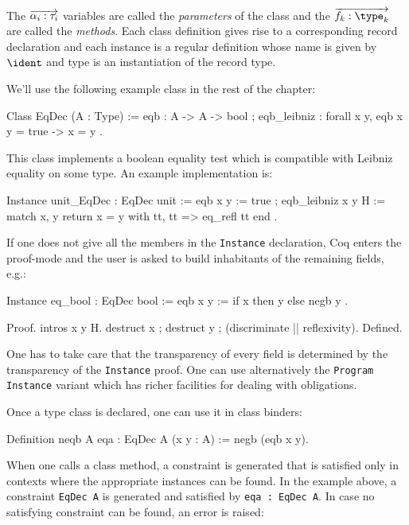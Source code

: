 The $\overrightarrow{\alpha_i : \tau_i}$ variables are called the \emph{parameters}
of the class and the $\tele{f_k : \type_k}$ are called the
\emph{methods}. Each class definition gives rise to a corresponding
record declaration and each instance is a regular definition whose name
is given by $\ident$ and type is an instantiation of the record type.

We'll use the following example class in the rest of the chapter:

\begin{coq_example*}
Class EqDec (A : Type) := {
  eqb : A -> A -> bool ;
  eqb_leibniz : forall x y, eqb x y = true -> x = y }.
\end{coq_example*}

This class implements a boolean equality test which is compatible with
Leibniz equality on some type. An example implementation is:

\begin{coq_example*}
Instance unit_EqDec : EqDec unit :=
{ eqb x y := true ;
  eqb_leibniz x y H := 
    match x, y return x = y with tt, tt => eq_refl tt end }.
\end{coq_example*}

If one does not give all the members in the \texttt{Instance}
declaration, Coq enters the proof-mode and the user is asked to build
inhabitants of the remaining fields, e.g.:

\begin{coq_example*}
Instance eq_bool : EqDec bool :=
{ eqb x y := if x then y else negb y }.
\end{coq_example*}
\begin{coq_example}
Proof. intros x y H.
  destruct x ; destruct y ; (discriminate || reflexivity). 
Defined.
\end{coq_example}

One has to take care that the transparency of every field is determined
by the transparency of the \texttt{Instance} proof. One can use
alternatively the \texttt{Program} \texttt{Instance}  variant which has
richer facilities for dealing with obligations.


Once a type class is declared, one can use it in class binders:
\begin{coq_example}
Definition neqb {A} {eqa : EqDec A} (x y : A) := negb (eqb x y).
\end{coq_example}

When one calls a class method, a constraint is generated that is
satisfied only in contexts where the appropriate instances can be
found. In the example above, a constraint \texttt{EqDec A} is generated and
satisfied by \texttt{{eqa : EqDec A}}. In case no satisfying constraint can be
found, an error is raised:

